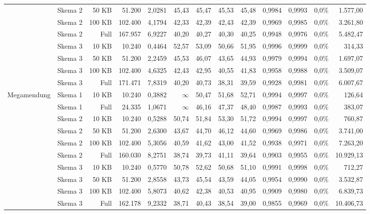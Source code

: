 \documentclass[12pt,journal]{IEEEtran}
\begin{document}
\begin{table}[t]
{\begin{tabular}{@{}llrrrrrrrrrrr@{}}
            & Skema 2 & 50 KB  & 51.200  & 2,0281 & 45,43 & 45,47 & 45,53 & 45,48 & 0,9984 & 0,9993 & 0,0\% & 1.577,00 \\
            & Skema 2 & 100 KB & 102.400 & 4,1794 & 42,33 & 42,39 & 42,43 & 42,39 & 0,9969 & 0,9985 & 0,0\% & 3.261,80 \\
            & Skema 2 & Full   & 167.957 & 6,9227 & 40,20 & 40,27 & 40,30 & 40,25 & 0,9948 & 0,9976 & 0,0\% & 5.482,47 \\
            & Skema 3 & 10 KB  & 10.240  & 0,4464 & 52,57 & 53,09 & 50,66 & 51,95 & 0,9996 & 0,9999 & 0,0\% & 314,33 \\
            & Skema 3 & 50 KB  & 51.200  & 2,2459 & 45,53 & 46,07 & 43,65 & 44,93 & 0,9979 & 0,9994 & 0,0\% & 1.697,07 \\
            & Skema 3 & 100 KB & 102.400 & 4,6325 & 42,43 & 42,95 & 40,55 & 41,83 & 0,9958 & 0,9988 & 0,0\% & 3.509,07 \\
            & Skema 3 & Full   & 171.471 & 7,8319 & 40,20 & 40,73 & 38,31 & 39,59 & 0,9928 & 0,9981 & 0,0\% & 6.007,67 \\
\midrule
Megamendung & Skema 1 & 10 KB  & 10.240  & 0,3882 & $\infty$ & 50,47 & 51,68 & 52,71 & 0,9994 & 0,9997 & 0,0\% & 126,64 \\
            & Skema 1 & Full   & 24.335  & 1,0671 & $\infty$ & 46,16 & 47,37 & 48,40 & 0,9987 & 0,9993 & 0,0\% & 383,07 \\
            & Skema 2 & 10 KB  & 10.240  & 0,5288 & 50,74 & 51,84 & 53,30 & 51,72 & 0,9994 & 0,9997 & 0,0\% & 760,87 \\
            & Skema 2 & 50 KB  & 51.200  & 2,6300 & 43,67 & 44,70 & 46,12 & 44,60 & 0,9969 & 0,9986 & 0,0\% & 3.741,00 \\
            & Skema 2 & 100 KB & 102.400 & 5,3056 & 40,59 & 41,62 & 43,00 & 41,52 & 0,9938 & 0,9971 & 0,0\% & 7.263,20 \\
            & Skema 2 & Full   & 160.030 & 8,2751 & 38,74 & 39,73 & 41,11 & 39,64 & 0,9903 & 0,9955 & 0,0\% & 10.929,13 \\
            & Skema 3 & 10 KB  & 10.240  & 0,5770 & 50,78 & 52,62 & 50,68 & 51,10 & 0,9991 & 0,9998 & 0,0\% & 712,27 \\
            & Skema 3 & 50 KB  & 51.200  & 2,8558 & 43,73 & 45,54 & 43,59 & 44,05 & 0,9954 & 0,9990 & 0,0\% & 3.532,87 \\
            & Skema 3 & 100 KB & 102.400 & 5,8073 & 40,62 & 42,38 & 40,53 & 40,95 & 0,9909 & 0,9980 & 0,0\% & 6.839,73 \\
            & Skema 3 & Full   & 162.178 & 9,2332 & 38,71 & 40,43 & 38,54 & 39,00 & 0,9855 & 0,9969 & 0,0\% & 10.406,73 \\
\bottomrule
\end{tabular}%
}
\end{table}
\end{document}
